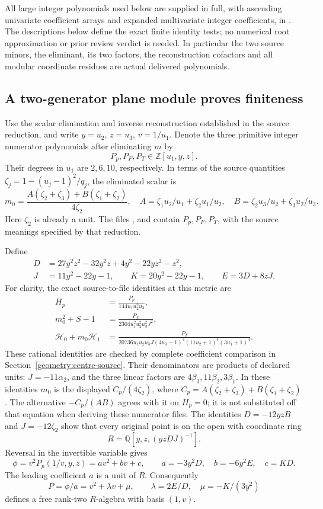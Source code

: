 \documentclass[11pt,a4paper]{article}
\theoremstyle{remark}\newtheorem{remark}[theorem]{Remark}
\begin{document}
All large integer polynomials used below are supplied in full, with
ascending univariate coefficient arrays and expanded multivariate integer
coefficients, in . The descriptions below define
the exact finite identity tests; no numerical root approximation or prior
review verdict is needed. In particular the two source minors, the
eliminant, its two factors, the reconstruction cofactors and all modular
coordinate residues are actual delivered polynomials.

\subsection{A two-generator plane module proves finiteness}
Use the scalar elimination and inverse reconstruction established in the
source reduction, and write $y=u_2$, $z=u_3$, $v=1/u_1$. Denote the three
primitive integer numerator polynomials after eliminating $m$ by
\[
 P_p,P_F,P_T\in\mathbb Z[u_1,y,z].
\]
Their degrees in $u_1$ are $2,6,10$, respectively. In terms of the source
quantities $\zeta_j=1-(u_j-1)^2/q_j$, the eliminated scalar is
\[
 m_0=\frac{A(\zeta_2+\zeta_3)+B(\zeta_1+\zeta_2)}{4\zeta_2},\quad
 A=\zeta_1u_2/u_1+\zeta_2u_1/u_2,\quad
 B=\zeta_2u_3/u_2+\zeta_3u_2/u_3.
\]
Here $\zeta_2$ is already a unit. The files , 
and  contain $P_p,P_F,P_T$, with the source meanings
specified by that reduction.

Define
\begin{align*}
 D&=27y^2z^2-32y^2z+4y^2-22yz^2-z^2,\\
 J&=11y^2-22y-1,\qquad K=20y^2-22y-1,\qquad E=3D+8zJ.
\end{align*}
For clarity, the exact source-to-file identities at this metric are
\begin{align}
 H_p&=\frac{P_p}{144u_1u_2^2u_3},\label{centre:source1}\\
 m_0^2+S-1&=\frac{P_F}{2304u_1^2u_2^2u_3^2J^2},\label{centre:source2}\\
 \mathcal H_0+m_0\mathcal H_1
 &=\frac{P_T}{20736u_1u_2u_3J
 (4u_3-1)^4(11u_2+1)^4(3u_1+1)^4}.\label{centre:source3}
\end{align}
These rational identities are checked by complete coefficient comparison
in Section~\ref{geometry:centre-source}. Their denominators are products
of declared units: $J=-11\alpha_2$, and the three linear factors are
$4\beta_3,11\beta_2,3\beta_1$. In these identities $m_0$ is the
displayed $C_p/(4\zeta_2)$, where
$C_p=A(\zeta_2+\zeta_3)+B(\zeta_1+\zeta_2)$. The alternative
$-C_p/(AB)$ agrees with it on $H_p=0$; it is not substituted off that
equation when deriving these numerator files.
The identities $D=-12yzB$ and $J=-12\zeta_2$ show that every original
point is on the open with coordinate ring
\[
 R=\mathbb Q[y,z,(yzDJ)^{-1}].
\]
Reversal in the invertible variable gives
\[
 \phi=v^2P_p(1/v,y,z)=a v^2+bv+c,\qquad
 a=-3y^2D,\quad b=-6y^2E,\quad c=KD.
\]
The leading coefficient $a$ is a unit of $R$. Consequently
\[
 P=\phi/a=v^2+\lambda v+\mu,\qquad
 \lambda=2E/D,\quad \mu=-K/(3y^2)
\]
defines a free rank-two $R$-algebra with basis $(1,v)$.
\end{document}
